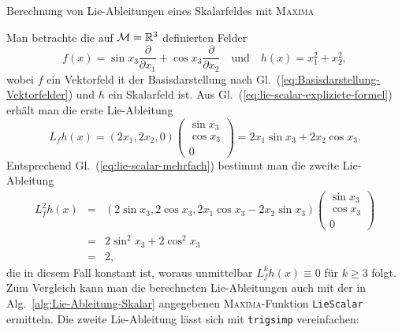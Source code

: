 \begin{algorithm}


\caption{Berechnung von Lie-Ableitungen eines Skalarfeldes mit \textsc{Maxima\label{alg:Lie-Ableitung-Skalar}}}
\end{algorithm}

\begin{example}
\label{exa:Lie-Skalar1}Man betrachte die auf $\mathcal{M}={\mathbb{R}}^{3}$
definierten Felder 
\begin{equation}
f(x)=\sin x_{3}\frac{\partial}{\partial x_{1}}+\cos x_{3}\frac{\partial}{\partial x_{2}}\quad\text{und}\quad h(x)=x_{1}^{2}+x_{2}^{2},\label{eq:bsp-Lie-Skalar-f-h}
\end{equation}
wobei $f$ ein Vektorfeld it der Basisdarstellung nach Gl.~(\ref{eq:Basisdarstellung-Vektorfelder})
und $h$ ein Skalarfeld ist. Aus Gl.~(\ref{eq:lie-scalar-expliziete-formel})
erhält man die erste Lie-Ableitung 
\[
L_{f}h(x)=\left(2x_{1},2x_{2},0\right)\left(\begin{array}{c}
\sin x_{3}\\
\cos x_{3}\\
0
\end{array}\right)=2x_{1}\sin x_{3}+2x_{2}\cos x_{3}.
\]
Entsprechend Gl.~(\ref{eq:lie-scalar-mehrfach}) bestimmt man die
zweite Lie-Ableitung
\begin{eqnarray*}
L_{f}^{2}h(x) & = & \left(2\sin x_{3},2\cos x_{3},2x_{1}\cos x_{3}-2x_{2}\sin x_{3}\right)\left(\begin{array}{c}
\sin x_{3}\\
\cos x_{3}\\
0
\end{array}\right)\\
 & = & 2\sin^{2}x_{3}+2\cos^{2}x_{3}\\
 & = & 2,
\end{eqnarray*}
die in diesem Fall konstant ist, woraus unmittelbar $L_{f}^{k}h(x)\equiv0$
für $k\geq3$ folgt. Zum Vergleich kann man die berechneten Lie-Ableitungen
auch mit der in Alg.~\ref{alg:Lie-Ableitung-Skalar} angegebenen
\textsc{Maxima}-Funktion \texttt{LieScalar} ermitteln. Die zweite
Lie-Ableitung lässt sich mit \texttt{trigsimp} vereinfachen:

\begin{maxima}\end{maxima}
\end{example}

